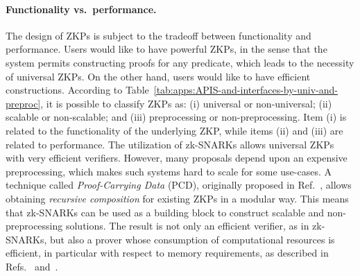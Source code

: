 \paragraph{Functionality vs.\ performance.}
	The design of ZKPs is subject to the tradeoff between functionality and performance. 
	Users would like to have powerful ZKPs, in the sense that the system permits constructing %
proofs for any predicate, which %
leads to the necessity of universal ZKPs. 
	On the other hand, users would like to have efficient constructions. 
	According to Table~\ref{tab:apps:APIS-and-interfaces-by-univ-and-preproc}, it is possible to classify ZKPs as:
(i) universal or non-universal;
(ii) scalable or non-scalable; and 
(iii) preprocessing or non-preprocessing. 
	Item (i) is related to the functionality of the underlying %
ZKP, while items (ii) and (iii) are related to performance. 
	The utilization of zk-SNARKs allows %
universal ZKPs with very efficient verifiers. 
	However, many proposals %
depend upon an expensive preprocessing, which makes such systems hard to scale for some use-cases. 
	A technique called \textit{Proof-Carrying Data} (PCD), originally proposed in Ref.~\cite{2010:ICS:proof-carrying-data}, 
allows obtaining %
\textit{recursive composition} for existing ZKPs in a modular way. %
	This means that zk-SNARKs can be used as a building block to construct scalable and non-preprocessing solutions.
	The result is not only an efficient verifier, as in zk-SNARKs, but also a prover whose consumption of computational resources is efficient, in particular with respect to memory requirements, as described in Refs.~\cite{2017:Alg:Scalable-Zero-Knowledge-Via-Cycles-of-Elliptic-Curves} and~\cite{2013:Recursive-Composition-and-Bootstrapping-for-SNARKS-and-Proof-carrying-Data}.
\loosen



